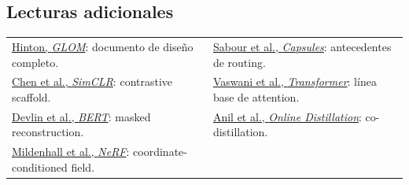 \subsection{Lecturas adicionales}

\begin{center}
\footnotesize
\begin{tabularx}{\textwidth}{>{\raggedright\arraybackslash}X>{\raggedright\arraybackslash}X}
\href{https://arxiv.org/abs/2102.12627}{Hinton, \emph{GLOM}}: documento de diseño completo. &
\href{https://arxiv.org/abs/1710.09829}{Sabour et al., \emph{Capsules}}: antecedentes de routing. \\[0.25em]
\href{https://arxiv.org/abs/2002.05709}{Chen et al., \emph{SimCLR}}: contrastive scaffold. &
\href{https://arxiv.org/abs/1706.03762}{Vaswani et al., \emph{Transformer}}: línea base de attention. \\[0.25em]
\href{https://arxiv.org/abs/1810.04805}{Devlin et al., \emph{BERT}}: masked reconstruction. &
\href{https://arxiv.org/abs/1804.03235}{Anil et al., \emph{Online Distillation}}: co-distillation. \\[0.25em]
\href{https://arxiv.org/abs/2003.08934}{Mildenhall et al., \emph{NeRF}}: coordinate-conditioned field. & \\
\end{tabularx}
\end{center}


